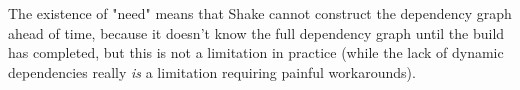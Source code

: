 The existence of \lst"need" means that Shake cannot construct the
dependency graph ahead of time, because it doesn't know the full
dependency graph until the build has completed, but this is not a
limitation in practice (while the lack of dynamic dependencies really
\emph{is} a limitation requiring painful workarounds).


%
%
%
%
%
%

